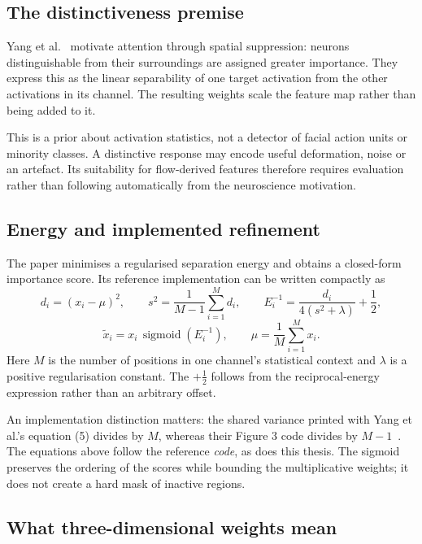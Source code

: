 \subsection{The distinctiveness premise}
\label{sec:simam-premise}

Yang et al.~\cite{yang2021} motivate attention through spatial suppression: neurons distinguishable from their surroundings are assigned greater importance. They express this as the linear separability of one target activation from the other activations in its channel. The resulting weights scale the feature map rather than being added to it.

This is a prior about activation statistics, not a detector of facial action units or minority classes. A distinctive response may encode useful deformation, noise or an artefact. Its suitability for flow-derived features therefore requires evaluation rather than following automatically from the neuroscience motivation.

\subsection{Energy and implemented refinement}
\label{sec:simam-energy}

The paper minimises a regularised separation energy and obtains a closed-form importance score. Its reference implementation can be written compactly as
\[
    d_i=(x_i-\mu)^2,\qquad
    s^2=\frac{1}{M-1}\sum_{i=1}^{M}d_i,\qquad
    E_i^{-1}=\frac{d_i}{4(s^2+\lambda)}+\frac{1}{2},
\]
\[
    \widetilde{x}_i=x_i\,\operatorname{sigmoid}(E_i^{-1}),
    \qquad \mu=\frac{1}{M}\sum_{i=1}^{M}x_i.
\]
Here $M$ is the number of positions in one channel's statistical context and $\lambda$ is a positive regularisation constant. The $+\tfrac12$ follows from the reciprocal-energy expression rather than an arbitrary offset.

An implementation distinction matters: the shared variance printed with Yang et al.'s equation (5) divides by $M$, whereas their Figure 3 code divides by $M-1$~\cite{yang2021}. The equations above follow the reference \emph{code}, as does this thesis. The sigmoid preserves the ordering of the scores while bounding the multiplicative weights; it does not create a hard mask of inactive regions.

\subsection{What three-dimensional weights mean}
\label{sec:simam-3d-weights}

